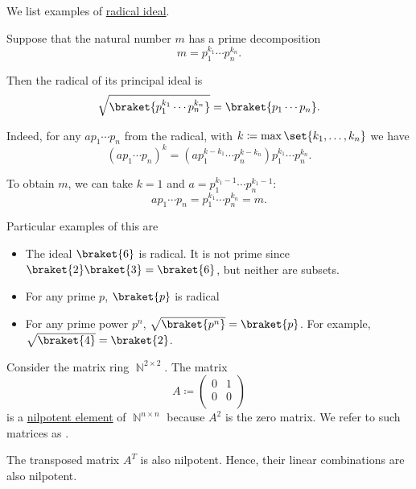 \begin{example}\label{ex:def:radical_ideal}
  We list examples of \hyperref[def:radical_ideal]{radical ideal}.

  \begin{thmenum}
     Suppose that the natural number \( m \) has a prime decomposition
    \begin{equation*}
      m = p_1^{k_1} \cdots p_n^{k_n}.
    \end{equation*}

    Then the radical of its principal ideal is
    \begin{equation*}
      \sqrt{ \braket{ p_1^{k_1} \cdots p_n^{k_n} } } = \braket{ p_1 \cdots p_n }.
    \end{equation*}

    Indeed, for any \( a p_1 \cdots p_n \) from the radical, with \( k \coloneqq \max\set{ k_1, \ldots, k_n } \) we have
    \begin{equation*}
      (a p_1 \cdots p_n)^k = (a p_1^{k-k_1} \cdots p_n^{k-k_n}) p_1^{k_1} \cdots p_n^{k_n}.
    \end{equation*}

    To obtain \( m \), we can take \( k = 1 \) and \( a = p_1^{k_1-1} \cdots p_n^{k_1-1} \):
    \begin{equation*}
      a p_1 \cdots p_n = p_1^{k_1} \cdots p_n^{k_n} = m.
    \end{equation*}

    Particular examples of this are
    \begin{itemize}
      \item The ideal \( { \braket{ 6 } } \) is radical. It is not prime since \( \braket{ 2 } \braket{ 3 } = \braket{ 6 } \), but neither are subsets.

      \item For any prime \( p \), \( \braket{ p } \) is radical

      \item For any prime power \( p^n \), \( \sqrt{\braket{ p^n }} = \braket{ p } \). For example, \( \sqrt{\braket{ 4 }} = \braket{ 2 } \).
    \end{itemize}

     Consider the matrix ring \( \BbbN^{2 \times 2} \). The matrix
    \begin{equation*}
      A \coloneqq
      \begin{pmatrix}
        0 & 1 \\
        0 & 0 \\
      \end{pmatrix}
    \end{equation*}
    is a \hyperref[thm:def:semiring_ideal/nilradical]{nilpotent element} of \( \BbbN^{n \times n} \) because \( A^2 \) is the zero matrix. We refer to such matrices as .

    The transposed matrix \( A^T \) is also nilpotent. Hence, their linear combinations are also nilpotent.
  \end{thmenum}
\end{example}
